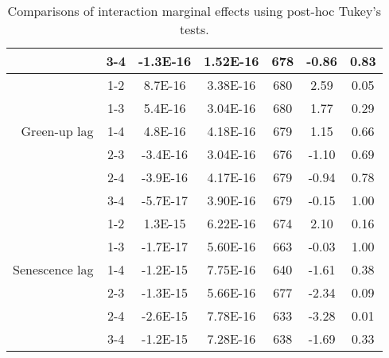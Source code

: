 \begin{table}[H]
\begin{tabular}{rcccccc}
   & 3-4 & -1.3E-16 & 1.52E-16 & 678 & -0.86 & 0.83 \\ 
   \hline
 & 1-2 & 8.7E-16 & 3.38E-16 & 680 & 2.59 & 0.05 \\ 
   & 1-3 & 5.4E-16 & 3.04E-16 & 680 & 1.77 & 0.29 \\ 
  Green-up lag & 1-4 & 4.8E-16 & 4.18E-16 & 679 & 1.15 & 0.66 \\ 
   & 2-3 & -3.4E-16 & 3.04E-16 & 676 & -1.10 & 0.69 \\ 
   & 2-4 & -3.9E-16 & 4.17E-16 & 679 & -0.94 & 0.78 \\ 
   & 3-4 & -5.7E-17 & 3.90E-16 & 679 & -0.15 & 1.00 \\ 
   \hline
 & 1-2 & 1.3E-15 & 6.22E-16 & 674 & 2.10 & 0.16 \\ 
   & 1-3 & -1.7E-17 & 5.60E-16 & 663 & -0.03 & 1.00 \\ 
  Senescence lag & 1-4 & -1.2E-15 & 7.75E-16 & 640 & -1.61 & 0.38 \\ 
   & 2-3 & -1.3E-15 & 5.66E-16 & 677 & -2.34 & 0.09 \\ 
   & 2-4 & -2.6E-15 & 7.78E-16 & 633 & -3.28 & 0.01 \\ 
   & 3-4 & -1.2E-15 & 7.28E-16 & 638 & -1.69 & 0.33 \\ 
   \hline
\end{tabular}
\caption{Comparisons of interaction marginal effects using post-hoc Tukey's tests.} 
\label{lsq_terms}
\end{table}


